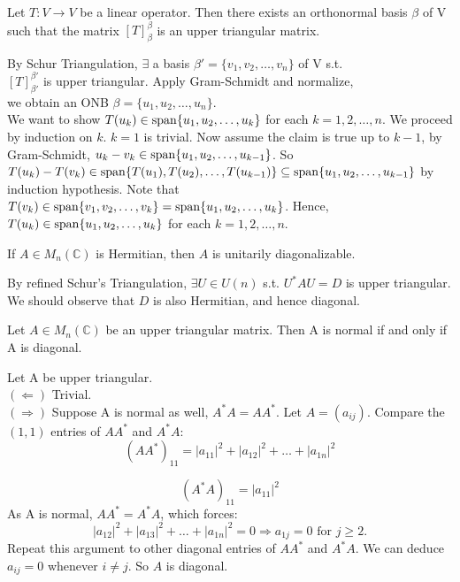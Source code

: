 \begin{theorem}
Let $T: V \rightarrow V$ be a linear operator. Then there exists an orthonormal basis $\beta$ of V such that the matrix $[T]_{\beta}^{\beta}$ is an upper triangular matrix.
\label{refined schur}
\end{theorem}

\begin{pfbox}
By Schur Triangulation,
$\exists$ a basis $\beta' = \{v_1, v_2, \dots, v_n\}$ of V s.t.\\
$[T]_{\beta'}^{\beta'}$ is upper triangular.
Apply Gram-Schmidt and normalize,\\
we obtain an ONB $\beta=\{u_1, u_2, \dots, u_n\}$.\\
We want to show $T(u_k) \in \operatorname{span}\{u_1, u_2, \dots, u_k\}$ for each $k=1,2,\dots,n$.
We proceed by induction on $k$. $k=1$ is trivial.
Now assume the claim is true up to $k-1$,
by Gram-Schmidt, $u_k-v_k \in \operatorname{span}\{u_1, u_2, \dots, u_{k-1}\}$.
So $T(u_k)-T(v_k) \in \operatorname{span}\{T(u_1), T(u_2), \dots, T(u_{k-1})\} \subseteq \operatorname{span}\{u_1, u_2, \dots, u_{k-1}\}$ by induction hypothesis.
Note that $T(v_k) \in \operatorname{span}\{v_1, v_2, \dots, v_k\} = \operatorname{span}\{u_1, u_2, \dots, u_k\}$.
Hence, $T(u_k) \in \operatorname{span}\{u_1, u_2, \dots, u_k\}$ for each $k=1,2,\dots,n$.
\end{pfbox}


\begin{theorem}
If $A\in M_{n}(\mathbb{C})$ is Hermitian, then $A$ is unitarily diagonalizable.
\end{theorem}

\begin{pfbox}
By refined Schur's Triangulation, $\exists U \in U(n)$ s.t. $U^{*}AU = D$ is upper triangular.
We should observe that $D$ is also Hermitian, and hence diagonal.
\end{pfbox}

\begin{theorem}
Let $A\in M_{n}(\mathbb{C})$ be an upper triangular matrix. Then A is normal if and only if A is diagonal.
\label{A is upper trig. then A is normal iff diagonal}
\end{theorem}

\begin{pfbox}
Let A be upper triangular.\\
$(\Leftarrow)$ Trivial.\\
$(\Rightarrow)$ Suppose A is normal as well, $A^{*}A = AA^{*}$. Let $A=(a_{ij})$.
Compare the $(1,1)$ entries of $AA^{*}$ and $A^{*}A$:
\[
(AA^{*})_{11} = |a_{11}|^2 + |a_{12}|^2 + \dots + |a_{1n}|^2
\]

\[
(A^{*}A)_{11} = |a_{11}|^2
\]
As A is normal, $AA^{*} = A^{*}A$, which forces:
\[
|a_{12}|^2 + |a_{13}|^2 + \dots + |a_{1n}|^2 = 0 \Rightarrow a_{1j} = 0 \text{ for } j \geq 2.
\]
Repeat this argument to other diagonal entries of $AA^{*}$ and $A^{*}A$. We can deduce $a_{ij} = 0$ whenever $i \neq j$.
So $A$ is diagonal.
\end{pfbox}


